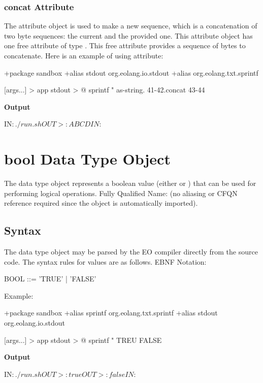 \documentclass[12pt]{book}
\begin{document}
{\subsubsection{concat Attribute}
The  attribute object is used to make a new sequence, which is a concatenation of two byte sequences: the current and the provided one. This attribute object has one free attribute of type . This free attribute provides a sequence of bytes to concatenate. Here is an example of using  attribute:

\begin{ffcode}
+package sandbox
+alias stdout org.eolang.io.stdout
+alias org.eolang.txt.sprintf

[args...] > app
  stdout > @
    sprintf
      "%
      as-string.
        41-42.concat 43-44
\end{ffcode}
\textbf{Output}
\begin{ffcode}
IN$: ./run.sh
OUT>: ABCD
IN$: 
\end{ffcode}

\section{bool Data Type Object}
The  data type object represents a boolean value (either  or ) that can be used for performing logical operations.
Fully Qualified Name:  (no aliasing or CFQN reference required since the object is automatically imported).

\subsection{Syntax}
The  data type object may be parsed by the EO compiler directly from the source code. The syntax rules for  values are as follows. EBNF Notation:
\begin{ffcode}
BOOL     ::= 'TRUE'
           | 'FALSE'
\end{ffcode}
Example:
\begin{ffcode}
+package sandbox
+alias sprintf org.eolang.txt.sprintf
+alias stdout org.eolang.io.stdout

[args...] > app
  stdout > @
    sprintf
      "%
      TREU
      FALSE
\end{ffcode}
\textbf{Output}
\begin{ffcode}
IN$: ./run.sh
OUT>: true
OUT>: false
IN$: 
\end{ffcode}

}
\end{document}
